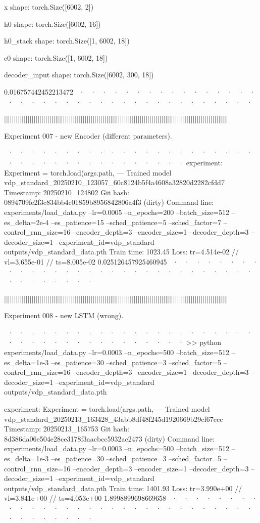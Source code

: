 x shape: torch.Size([6002, 2])

h0 shape: torch.Size([6002, 16])

h0_stack shape: torch.Size([1, 6002, 18])

c0 shape: torch.Size([1, 6002, 18])

decoder_input shape: torch.Size([6002, 300, 18])



0.016757442452213472
~· ~· ~· ~· ~· ~· ~· ~· ~· ~· ~· ~· ~· ~· ~· ~· ~· ~· ~· ~· ~· ~· ~· ~· ~· ~· ~· ~· ~· ~· ~· ~· ~· ~· ~· ~· ~· ~·



||||||||||||||||||||||||||||||||||||||||||||||||||||||||||||||||||||||||||||||||||||||||||||||||||||||||||||||||||


Experiment 007 - new Encoder (different parameters). 


~· ~· ~· ~· ~· ~· ~· ~· ~· ~· ~· ~· ~· ~· ~· ~· ~· ~· ~· ~· ~· ~· ~· ~· ~· ~· ~· ~· ~· ~· ~· ~· ~· ~· ~· ~· ~· ~· 
  experiment: Experiment = torch.load(args.path,
--- Trained model   vdp_standard_20250210_123057_60c8124b5f4a4608a32820d2282cfdd7
Timestamp:      20250210_124802
Git hash:       0894709fe2f3c834bb4c01859b8956842806a4f3 (dirty)
Command line:   experiments/load_data.py --lr=0.0005 --n_epochs=200 --batch_size=512 --es_delta=2e-4 --es_patience=15 --sched_patience=5 --sched_factor=7 --control_rnn_size=16 --encoder_depth=3 --encoder_size=1 --decoder_depth=3 --decoder_size=1 --experiment_id=vdp_standard outputs/vdp_standard_data.pth
Train time:     1023.45
Loss:           tr=4.514e-02 // vl=3.655e-01 // ts=8.005e-02
0.025126457925460945
~· ~· ~· ~· ~· ~· ~· ~· ~· ~· ~· ~· ~· ~· ~· ~· ~· ~· ~· ~· ~· ~· ~· ~· ~· ~· ~· ~· ~· ~· ~· ~· ~· ~· ~· ~· ~· ~· 



||||||||||||||||||||||||||||||||||||||||||||||||||||||||||||||||||||||||||||||||||||||||||||||||||||||||||||||||||


Experiment 008 - new LSTM (wrong). 


~· ~· ~· ~· ~· ~· ~· ~· ~· ~· ~· ~· ~· ~· ~· ~· ~· ~· ~· ~· ~· ~· ~· ~· ~· ~· ~· ~· ~· ~· ~· ~· ~· ~· ~· ~· ~· ~· 
>> python experiments/load_data.py --lr=0.0003 --n_epochs=500 --batch_size=512 --es_delta=1e-3 --es_patience=30 --sched_patience=3 --sched_factor=5 --control_rnn_size=16 --encoder_depth=3 --encoder_size=1 --decoder_depth=3 --decoder_size=1 --experiment_id=vdp_standard outputs/vdp_standard_data.pth

experiment: Experiment = torch.load(args.path,
--- Trained model   vdp_standard_20250213_163428_43abb8df48f245d1920669b29cf67ccc
Timestamp:      20250213_165753
Git hash:       8d386da06e504e28ce3178f3aacbcc5932ac2473 (dirty)
Command line:   experiments/load_data.py --lr=0.0003 --n_epochs=500 --batch_size=512 --es_delta=1e-3 --es_patience=30 --sched_patience=3 --sched_factor=5 --control_rnn_size=16 --encoder_depth=3 --encoder_size=1 --decoder_depth=3 --decoder_size=1 --experiment_id=vdp_standard outputs/vdp_standard_data.pth
Train time:     1401.93
Loss:           tr=3.990e+00 // vl=3.841e+00 // ts=4.053e+00
1.8998899698669658
~· ~· ~· ~· ~· ~· ~· ~· ~· ~· ~· ~· ~· ~· ~· ~· ~· ~· ~· ~· ~· ~· ~· ~· ~· ~· ~· ~· ~· ~· ~· ~· ~· ~· ~· ~· ~· ~· 



